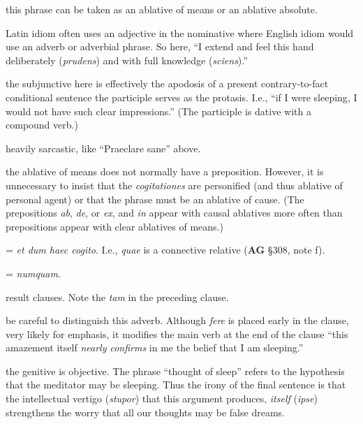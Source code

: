  this phrase can be taken as an ablative of means or an ablative absolute.

 Latin idiom often uses an adjective in the nominative where English idiom would use an adverb or adverbial phrase. So here, ``I extend and feel this hand deliberately (\textit{prudens}) and with full knowledge (\textit{sciens}).''

 the subjunctive here is effectively the apodosis of a present contrary-to-fact conditional sentence the participle serves as the protasis. I.e., ``if I were sleeping, I would not have such clear impressions.'' (The participle is dative with a compound verb.) 

 heavily sarcastic, like ``Praeclare sane'' above.

 the ablative of means does not normally have a preposition. However, it is unnecessary to insist that the \textit{cogitationes} are personified (and thus ablative of personal agent) or that the phrase must be an ablative of cause. (The prepositions \textit{ab}, \textit{de}, or \textit{ex}, and \textit{in} appear with causal ablatives more often than prepositions appear with clear ablatives of means.)

 = \textit{et dum haec cogito}. I.e., \textit{quae} is a connective relative (\textbf{AG} §308, note f).

 = \textit{numquam}.

 result clauses. Note the \textit{tam} in the preceding clause.

 be careful to distinguish this adverb. Although \textit{fere} is placed early in the clause, very likely for emphasis, it modifies the main verb at the end of the clause ``this amazement itself \textit{nearly confirms} in me the belief that I am sleeping.''

 the genitive is objective. The phrase ``thought of sleep'' refers to the hypothesis that the meditator may be sleeping. Thus the irony of the final sentence is that the intellectual vertigo (\textit{stupor}) that this argument produces, \textit{itself} (\textit{ipse}) strengthens the worry that all our thoughts may be false dreams.

\clearpage

